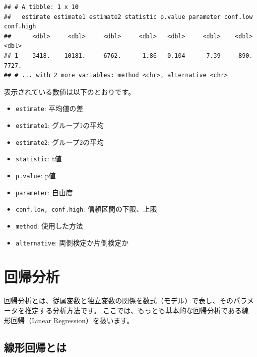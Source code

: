 \documentclass[]{book}
\newenvironment{Shaded}{\begin{snugshade}}{\end{snugshade}}
\newcommand{\KeywordTok}[1]{\textcolor[rgb]{0.13,0.29,0.53}{\textbf{#1}}}
\newcommand{\DataTypeTok}[1]{\textcolor[rgb]{0.13,0.29,0.53}{#1}}
\newcommand{\StringTok}[1]{\textcolor[rgb]{0.31,0.60,0.02}{#1}}
\newcommand{\OperatorTok}[1]{\textcolor[rgb]{0.81,0.36,0.00}{\textbf{#1}}}
\newcommand{\NormalTok}[1]{#1}
\providecommand{\tightlist}{%
  \setlength{\itemsep}{0pt}\setlength{\parskip}{0pt}}
\begin{document}
\begin{Shaded}
\end{Shaded}

\begin{verbatim}
## # A tibble: 1 x 10
##   estimate estimate1 estimate2 statistic p.value parameter conf.low conf.high
##      <dbl>     <dbl>     <dbl>     <dbl>   <dbl>     <dbl>    <dbl>     <dbl>
## 1    3418.    10181.     6762.      1.86   0.104      7.39    -890.     7727.
## # ... with 2 more variables: method <chr>, alternative <chr>
\end{verbatim}

表示されている数値は以下のとおりです。

\begin{itemize}
\tightlist
\item
  \texttt{estimate}: 平均値の差
\item
  \texttt{estimate1}: グループ1の平均
\item
  \texttt{estimate2}: グループ2の平均
\item
  \texttt{statistic}: t値
\item
  \texttt{p.value}: p値
\item
  \texttt{parameter}: 自由度
\item
  \texttt{conf.low,\ conf.high}: 信頼区間の下限、上限
\item
  \texttt{method}: 使用した方法
\item
  \texttt{alternative}: 両側検定か片側検定か
\end{itemize}

\chapter{回帰分析}\label{Regression}

回帰分析とは、従属変数と独立変数の関係を数式（モデル）で表し、そのパラメータを推定する分析方法です。
ここでは、もっとも基本的な回帰分析である線形回帰（Linear
Regression）を扱います。

\section{線形回帰とは}\label{ux7ddaux5f62ux56deux5e30ux3068ux306f}
\end{document}
